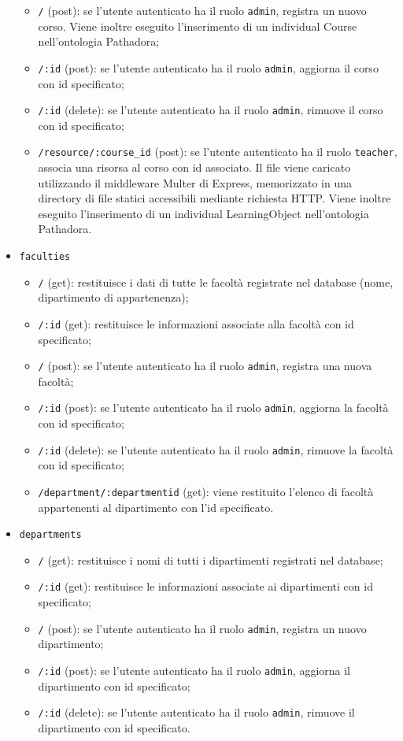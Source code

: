 \begin{itemize}
\begin{itemize}
		\item \texttt{/} (post): se l'utente autenticato ha il ruolo \texttt{admin}, registra un nuovo corso. Viene inoltre eseguito l'inserimento di un individual Course nell'ontologia Pathadora;
		\item \texttt{/:id} (post): se l'utente autenticato ha il ruolo \texttt{admin}, aggiorna il corso con id specificato;
		\item \texttt{/:id} (delete): se l'utente autenticato ha il ruolo \texttt{admin}, rimuove il corso con id specificato;
		\item \texttt{/resource/:course\_id} (post): se l'utente autenticato ha il ruolo \texttt{teacher}, associa una risorsa al corso con id associato. Il file viene caricato utilizzando il middleware Multer di Express, memorizzato in una directory di file statici accessibili mediante richiesta HTTP. Viene inoltre eseguito l'inserimento di un individual LearningObject nell'ontologia Pathadora.
	\end{itemize}
	\item \texttt{faculties}
	\begin{itemize}
		\item \texttt{/} (get): restituisce i dati di tutte le facoltà registrate nel database (nome, dipartimento di appartenenza);
		\item \texttt{/:id} (get): restituisce le informazioni associate alla facoltà con id specificato;
		\item \texttt{/} (post): se l'utente autenticato ha il ruolo \texttt{admin}, registra una nuova facoltà;
		\item \texttt{/:id} (post): se l'utente autenticato ha il ruolo \texttt{admin}, aggiorna la facoltà con id specificato;
		\item \texttt{/:id} (delete): se l'utente autenticato ha il ruolo \texttt{admin}, rimuove la facoltà con id specificato;
		\item \texttt{/department/:departmentid} (get): viene restituito l'elenco di facoltà appartenenti al dipartimento con l'id specificato.
	\end{itemize}
	\item \texttt{departments}
	\begin{itemize}
		\item \texttt{/} (get): restituisce i nomi di tutti i dipartimenti registrati nel database;
		\item \texttt{/:id} (get): restituisce le informazioni associate ai dipartimenti con id specificato;
		\item \texttt{/} (post): se l'utente autenticato ha il ruolo \texttt{admin}, registra un nuovo dipartimento;
		\item \texttt{/:id} (post): se l'utente autenticato ha il ruolo \texttt{admin}, aggiorna il dipartimento con id specificato;
		\item \texttt{/:id} (delete): se l'utente autenticato ha il ruolo \texttt{admin}, rimuove il dipartimento con id specificato.
	\end{itemize}
\end{itemize}

